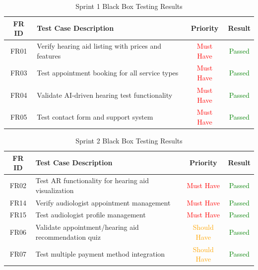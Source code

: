 \documentclass{article}
\begin{document}
\begin{table}[H]
\centering
\label{tab:sprint1-testing}
\begin{tabular}{|c|p{6cm}|c|c|}
\hline
\textbf{FR ID} & \textbf{Test Case Description} & \textbf{Priority} & \textbf{Result} \\ \hline
FR01 & Verify hearing aid listing with prices and features & \textcolor{red}{Must Have} & \textcolor{green}{Passed} \\ \hline
FR03 & Test appointment booking for all service types & \textcolor{red}{Must Have} & \textcolor{green}{Passed} \\ \hline
FR04 & Validate AI-driven hearing test functionality & \textcolor{red}{Must Have} & \textcolor{green}{Passed} \\ \hline
FR05 & Test contact form and support system & \textcolor{red}{Must Have} & \textcolor{green}{Passed} \\ \hline
\end{tabular}
\caption{Sprint 1 Black Box Testing Results}
\end{table}

\begin{table}[H]
\centering
\label{tab:sprint2-testing}
\begin{tabular}{|c|p{6cm}|c|c|}
\hline
\textbf{FR ID} & \textbf{Test Case Description} & \textbf{Priority} & \textbf{Result} \\ \hline
FR02 & Test AR functionality for hearing aid visualization & \textcolor{red}{Must Have} & \textcolor{green}{Passed} \\ \hline
FR14 & Verify audiologist appointment management & \textcolor{red}{Must Have} & \textcolor{green}{Passed} \\ \hline
FR15 & Test audiologist profile management & \textcolor{red}{Must Have} & \textcolor{green}{Passed} \\ \hline
FR06 & Validate appointment/hearing aid recommendation quiz & \textcolor{orange}{Should Have} & \textcolor{green}{Passed} \\ \hline
FR07 & Test multiple payment method integration & \textcolor{orange}{Should Have} & \textcolor{green}{Passed} \\ \hline
\end{tabular}
\caption{Sprint 2 Black Box Testing Results}
\end{table}
\end{document}
